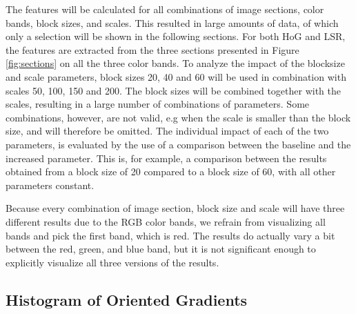 The features will be calculated for all combinations of image sections, color
bands, block sizes, and scales. This resulted in large amounts of data, of
which only a selection will be shown in the following sections. For both HoG
and LSR, the features are extracted from the three sections presented in Figure
\ref{fig:sections} on all the three color bands. To analyze the impact of the
blocksize and scale parameters, block sizes 20, 40 and 60 will be used in
combination with scales 50, 100, 150 and 200. The block sizes will be combined
together with the scales, resulting in a large number of combinations of
parameters.  Some combinations, however, are not valid, e.g when the scale is
smaller than the block size, and will therefore be omitted. The individual
impact of each of the two parameters, is evaluated by the use of a comparison
between the baseline and the increased parameter. This is, for example,
a comparison between the results obtained from a block size of 20 compared to
a block size of 60, with all other parameters constant. 

Because every combination of image section, block size and scale will have
three different results due to the RGB color bands, we refrain from visualizing
all bands and pick the first band, which is red. The results do actually vary
a bit between the red, green, and blue band, but it is not significant enough
to explicitly visualize all three versions of the results.

\subsection{Histogram of Oriented Gradients}

